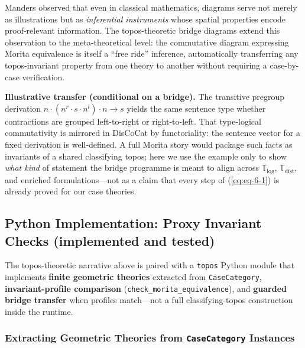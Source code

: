 \documentclass[
]{article}
\begin{document}
Manders \citeyearpar{manders2008euclidean} observed that even in
classical mathematics, diagrams serve not merely as illustrations but as
\emph{inferential instruments} whose spatial properties encode
proof-relevant information. The topos-theoretic bridge diagrams extend
this observation to the meta-theoretical level: the commutative diagram
expressing Morita equivalence is itself a ``free ride'' inference,
automatically transferring any topos-invariant property from one theory
to another without requiring a case-by-case verification.

\textbf{Illustrative transfer (conditional on a bridge).} The transitive
pregroup derivation \(n \cdot (n^r \cdot s \cdot n^l) \cdot n \to s\)
yields the same sentence type whether contractions are grouped
left-to-right or right-to-left. That type-logical commutativity is
mirrored in DisCoCat by functoriality: the sentence vector for a fixed
derivation is well-defined. A full Morita story would package such facts
as invariants of a shared classifying topos; here we use the example
only to show \emph{what kind} of statement the bridge programme is meant
to align across \(\mathbb{T}_{\text{log}}\),
\(\mathbb{T}_{\text{dist}}\), and enriched formulations---not as a claim
that every step of (\ref{eq:eq-6-1}) is already proved for our case
theories.

\subsection{\texorpdfstring{Python Implementation: Proxy Invariant
Checks (\textbf{implemented and
tested})}{Python Implementation: Proxy Invariant Checks (implemented and tested)}}\label{python-implementation-proxy-invariant-checks-implemented-and-tested}

The topos-theoretic narrative above is paired with a \texttt{topos}
Python module that implements \textbf{finite geometric theories}
extracted from \texttt{CaseCategory}, \textbf{invariant-profile
comparison} (\texttt{check\_morita\_equivalence}), and \textbf{guarded
bridge transfer} when profiles match---not a full classifying-topos
construction inside the runtime.

\subsubsection{\texorpdfstring{Extracting Geometric Theories from
\texttt{CaseCategory}
Instances}{Extracting Geometric Theories from CaseCategory Instances}}\label{extracting-geometric-theories-from-casecategory-instances}
\end{document}
